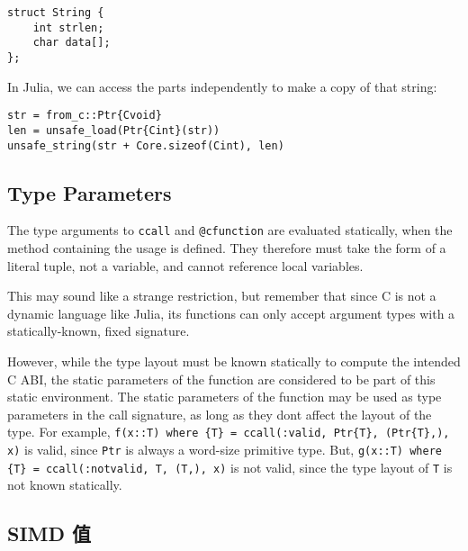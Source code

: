 \begin{lstlisting}
struct String {
    int strlen;
    char data[];
};
\end{lstlisting}



In Julia, we can access the parts independently to make a copy of that string:




\begin{verbatim}
str = from_c::Ptr{Cvoid}
len = unsafe_load(Ptr{Cint}(str))
unsafe_string(str + Core.sizeof(Cint), len)
\end{verbatim}



\hypertarget{7624173302473303801}{}


\subsection{Type Parameters}



The type arguments to \texttt{ccall} and \texttt{@cfunction} are evaluated statically, when the method containing the usage is defined. They therefore must take the form of a literal tuple, not a variable, and cannot reference local variables.



This may sound like a strange restriction, but remember that since C is not a dynamic language like Julia, its functions can only accept argument types with a statically-known, fixed signature.



However, while the type layout must be known statically to compute the intended C ABI, the static parameters of the function are considered to be part of this static environment. The static parameters of the function may be used as type parameters in the call signature, as long as they don{\textquotesingle}t affect the layout of the type. For example, \texttt{f(x::T) where \{T\} = ccall(:valid, Ptr\{T\}, (Ptr\{T\},), x)} is valid, since \texttt{Ptr} is always a word-size primitive type. But, \texttt{g(x::T) where \{T\} = ccall(:notvalid, T, (T,), x)} is not valid, since the type layout of \texttt{T} is not known statically.



\hypertarget{12802490213714574525}{}


\subsection{SIMD 值}



